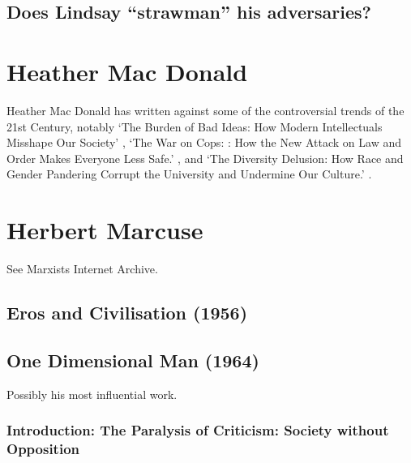 \documentclass[10pt,titlepage]{book}
\newcommand{\ignore}[1]{}
\begin{document}
\subsection{Does Lindsay ``strawman'' his adversaries?}

\ignore{

This has been alleged.
While not by any means constituting an authority on Lindsay, the accusation strikes me as so far off the mark that I wanted to respond with a short twitter thread.

This section is to play with that idea, it might not get anywhere, its probably too hard to do it in a small number of words.

}%

\section{Heather Mac Donald \cite{macdonald-bbi, macdonald-woc, macdonald-tdd}}

Heather Mac Donald has written against some of the controversial trends of the 21st Century, notably `The Burden of Bad Ideas: How Modern Intellectuals Misshape Our Society' \cite{macdonald-bbi}, `The War on Cops: : How the New Attack
on Law and Order Makes Everyone Less Safe.' \cite{macdonald-woc}, and `The Diversity Delusion: How Race and
Gender Pandering Corrupt the University and Undermine Our
Culture.' \cite{macdonald-tdd}.

\section{Herbert Marcuse}

See Marxists Internet Archive\cite{marcuse-mia}.

\subsection{Eros and Civilisation (1956) \cite{marcuse1956eros}}

\subsection{One Dimensional Man (1964) \cite{marcuse-one-dim}}

Possibly his most influential work.

\subsubsection{Introduction: The Paralysis of Criticism: Society without Opposition}
\end{document}
